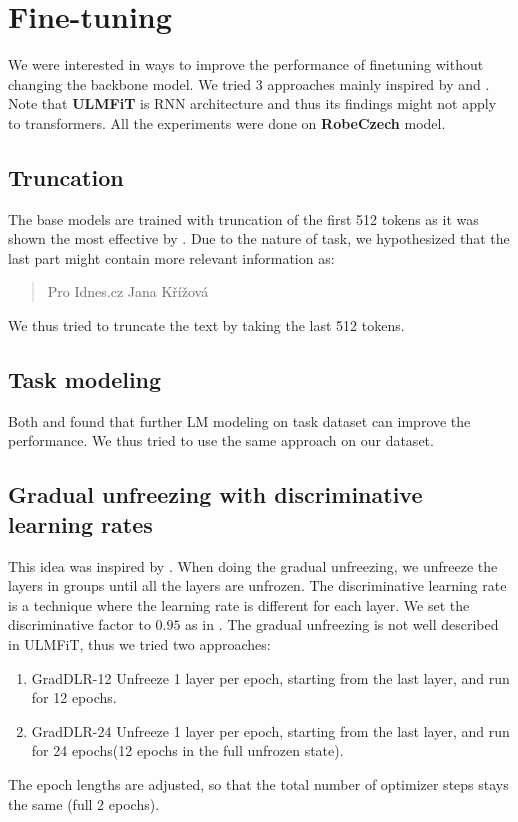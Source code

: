 \section{Fine-tuning}
\label{sec:finetuning}
We were interested in ways to improve the performance of finetuning without changing the backbone model.
We tried 3 approaches mainly inspired by \cite{howardUniversalLanguageModel2018a} and \cite{sunHowFineTuneBERT2020}.
Note that \textbf{ULMFiT} is RNN architecture and thus its findings might not apply to transformers.
All the experiments were done on \textbf{RobeCzech} model.

\subsection{Truncation}
\label{sec:truncation}
The base models are trained with truncation of the first 512 tokens as it was shown
the most effective by \cite{sunHowFineTuneBERT2020}. Due to the nature of task,
we hypothesized that the last part might contain more relevant information as:
\begin{quotation}
    Pro Idnes.cz Jana Křížová
\end{quotation}
We thus tried to truncate the text by taking the last
512 tokens.

\subsection{Task modeling}
\label{sec:task-modeling}
Both \cite{howardUniversalLanguageModel2018a} and \cite{sunHowFineTuneBERT2020} found that further LM modeling on
task dataset can improve the performance. We thus tried to use the same approach on our dataset.

\subsection{Gradual unfreezing with discriminative learning rates}
\label{sec:gradual-unfreezing}
This idea was inspired by \cite{howardUniversalLanguageModel2018a}.
When doing the gradual unfreezing, we unfreeze the layers in groups until all the layers are unfrozen.
The discriminative learning rate is a technique where the learning rate is different for each layer.
We set the discriminative factor to $0.95$ as in \cite{sunHowFineTuneBERT2020}.
The gradual unfreezing is not well described in ULMFiT, thus we tried two approaches:
\begin{enumerate}
    \item GradDLR-12 Unfreeze 1 layer per epoch, starting from the last layer, and run for 12 epochs.
    \item GradDLR-24 Unfreeze 1 layer per epoch, starting from the last layer, and run for 24 epochs(12 epochs in the full unfrozen state).
\end{enumerate}
The epoch lengths are adjusted, so that the total number of optimizer steps stays the same (full 2 epochs).

